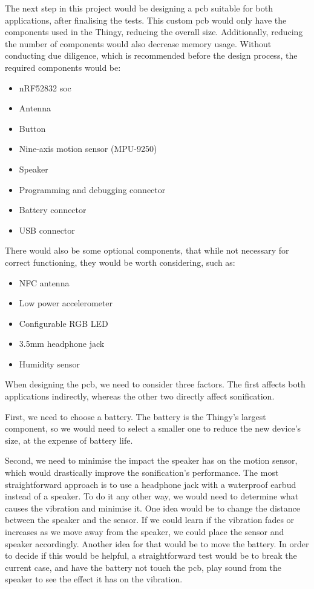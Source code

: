 The next step in this project would be designing a \gls{pcb} suitable for both applications, after finalising the tests. This custom \gls{pcb} would only have the components used in the Thingy, reducing the overall size. Additionally, reducing the number of components would also decrease memory usage. Without conducting due diligence, which is recommended before the design process, the required components would be:
\begin{itemize}
	\item nRF52832 \gls{soc}
	\item Antenna
	\item Button
	\item Nine-axis motion sensor (MPU-9250)
	\item Speaker
	\item Programming and debugging connector
	\item Battery connector
	\item USB connector
\end{itemize}

There would also be some optional components, that while not necessary for correct functioning, they would be worth considering, such as:
\begin{itemize}
	\item NFC antenna
	\item Low power accelerometer
	\item Configurable RGB LED
	\item 3.5mm headphone jack
	\item Humidity sensor
\end{itemize}

When designing the \gls{pcb}, we need to consider three factors. The first affects both applications indirectly, whereas the other two directly affect sonification.

First, we need to choose a battery. The battery is the Thingy's largest component, so we would need to select a smaller one to reduce the new device's size, at the expense of battery life.

Second, we need to minimise the impact the speaker has on the motion sensor, which would drastically improve the sonification's performance. The most straightforward approach is to use a headphone jack with a waterproof earbud instead of a speaker. To do it any other way, we would need to determine what causes the vibration and minimise it. One idea would be to change the distance between the speaker and the sensor. If we could learn if the vibration fades or increases as we move away from the speaker, we could place the sensor and speaker accordingly. Another idea for that would be to move the battery. In order to decide if this would be helpful, a straightforward test would be to break the current case, and have the battery not touch the \gls{pcb}, play sound from the speaker to see the effect it has on the vibration.

